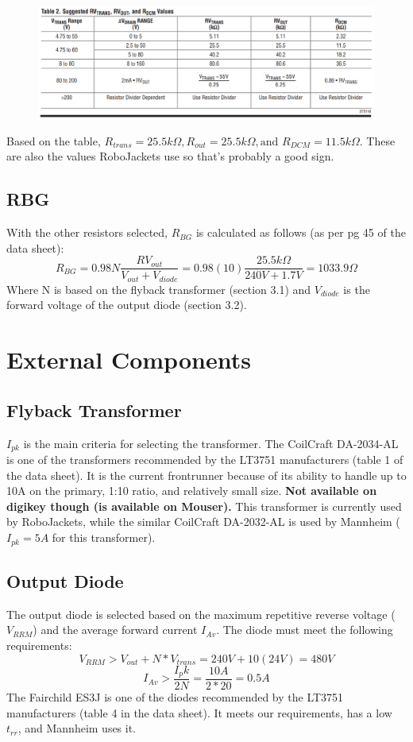 \documentclass{article}
\begin{document}
	\begin{figure}[h!]
		\includegraphics[width=\linewidth]{LT3571_Resistor_Values.png}
	\end{figure}

	\noindent Based on the table, $R_{trans} = 25.5k\Omega, R_{out} = 25.5k\Omega, \text{and } R_{DCM} = 11.5k\Omega$. These are also the values RoboJackets use so that's probably a good sign.

	\subsection{RBG}
	With the other resistors selected, $R_{BG}$ is calculated as follows (as per pg 45 of the data sheet):
	\[R_{BG} = 0.98N\dfrac{RV_{out}}{V_{out} + V_{diode}} = 0.98(10)\dfrac{25.5k\Omega}{240V + 1.7V} = 1033.9\Omega\]
	Where N is based on the flyback transformer (section 3.1) and $V_{diode}$ is the forward voltage of the output diode (section 3.2).
	
	\section{External Components}
	\subsection{Flyback Transformer}
	$I_{pk}$ is the main criteria for selecting the transformer. The CoilCraft DA-2034-AL is one of the transformers recommended by the LT3751 manufacturers (table 1 of the data sheet). It is the current frontrunner because of its ability to handle up to 10A on the primary, 1:10 ratio, and relatively small size. \textbf{Not available on digikey though (is available on Mouser).} This transformer is currently used by RoboJackets, while the similar CoilCraft DA-2032-AL is used by Mannheim ($I_{pk} = 5A$ for this transformer).
	\subsection{Output Diode}
	The output diode is selected based on the maximum repetitive reverse voltage ($V_{RRM}$) and the average forward current $I_{Av}$. The diode must meet the following requirements:
	\[V_{RRM} > V_{out} + N*V_{trans} = 240V + 10(24V)  = 480V\]
	\[I_{Av} > \dfrac{I_pk}{2N} = \dfrac{10A}{2*20} = 0.5A\]  
	The Fairchild ES3J is one of the diodes recommended by the LT3751 manufacturers (table 4 in the data sheet). It meets our requirements, has a low $t_{rr}$, and Mannheim uses it. 
\end{document}
